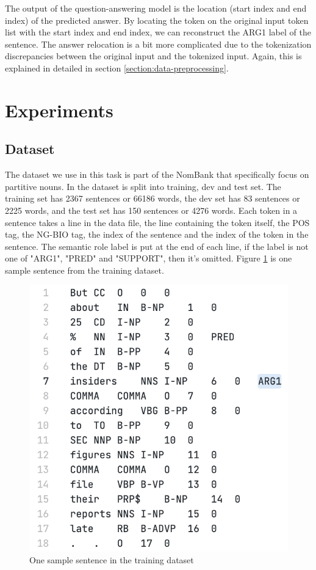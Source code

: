 \documentclass[11pt]{article}
\begin{document}
The output of the question-answering model is the location (start index and end index) of the predicted answer. By locating the token on the original input token list with the start index and end index, we can reconstruct the ARG1 label of the sentence. The answer relocation is a bit more complicated due to the tokenization discrepancies between the original input and the tokenized input. Again, this is explained in detailed in section \ref{section:data-preprocessing}.

\section{Experiments}

\subsection{Dataset}

The dataset we use in this task is part of the NomBank that specifically focus on partitive nouns. In the dataset is split into training, dev and test set. The training set has 2367 sentences or 66186 words, the dev set has 83 sentences or 2225 words, and the test set has 150 sentences or 4276 words. Each token in a sentence takes a line in the data file, the line containing the token itself, the POS tag, the NG-BIO tag, the index of the sentence and the index of the token in the sentence. The semantic role label is put at the end of each line, if the label is not one of "ARG1", "PRED" and "SUPPORT", then it's omitted. Figure \ref{fig:dataset-one-sample} is one sample sentence from the training dataset.

\begin{figure}[h]
  \centering
  \includegraphics[width=\linewidth]{assets/dataset-one-sample.png}
  \caption{One sample sentence in the training dataset}
  \label{fig:dataset-one-sample}
\end{figure}
\end{document}
